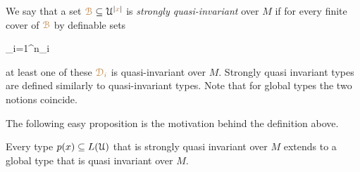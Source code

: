 \documentclass[creche.tex]{subfiles}
\begin{document}
We say that a set ${\color{brown}\EuScript B}\subseteq\EuScript U^{|{\color{brown} x}|}$ is \emph{strongly quasi-invariant\/} over $M$ if for every finite cover of ${\color{brown}\EuScript B}$ by definable sets

\ceq{\hfill\mrB}
{\subseteq}
{\bigcup_{i=1}^n\mr\D_i}

at least one of these $\color{brown}\EuScript D_i$ is quasi-invariant over $M$.
Strongly quasi invariant types are defined similarly to quasi-invariant types.
Note that for global types the two notions coincide.

The following easy proposition is the motivation behind the definition above.

\begin{proposition}
  Every type $p(x)\subseteq L(\EuScript U)$ that is strongly quasi invariant over $M$ extends to a global type that is quasi invariant over $M$.\QED
\end{proposition}






\end{document}
